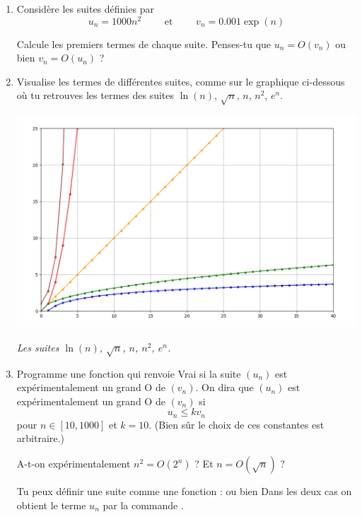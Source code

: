 \documentclass[11pt,class=report,crop=false]{standalone}
\begin{document}
\begin{activite}
   
 
\begin{enumerate}
	
  \item Considère les suites définies par 
  $$u_n = 1000 n^2 \qquad \text{ et } \qquad v_n = 0.001 \exp(n)$$
  
  Calcule les premiers termes de chaque suite. Penses-tu que $u_n =O(v_n)$ ou bien $v_n = O(u_n)$ ?
	
	
  \item Visualise les termes de différentes suites, comme sur le graphique ci-dessous
  où tu retrouves les termes des suites $\ln(n)$, $\sqrt{n}$, $n$, $n^2$, $e^n$.

 \begin{center}
 	\includegraphics[scale=\myscale,scale=0.3]{ecran-grandO}
 	
 	\emph{Les suites  $\ln(n)$, $\sqrt{n}$, $n$, $n^2$, $e^n$.}
 \end{center} 

  \item Programme une fonction  qui renvoie \og{}Vrai\fg{} si la suite $(u_n)$ est expérimentalement un grand O de $(v_n)$.
  On dira que $(u_n)$ est expérimentalement un grand O de $(v_n)$ si 
  $$u_n \le k v_n$$
  pour $n \in [10,1000]$ et $k=10$. (Bien sûr le choix de ces constantes est arbitraire.)
  
  A-t-on expérimentalement $n^2 = O(2^n)$ ? Et $n = O(\sqrt{n})$ ?
  
  Tu peux définir une suite  comme une fonction :
  ou bien   
  Dans les deux cas on obtient le terme $u_n$ par la commande .
  
\end{enumerate}

\end{activite}
\end{document}
